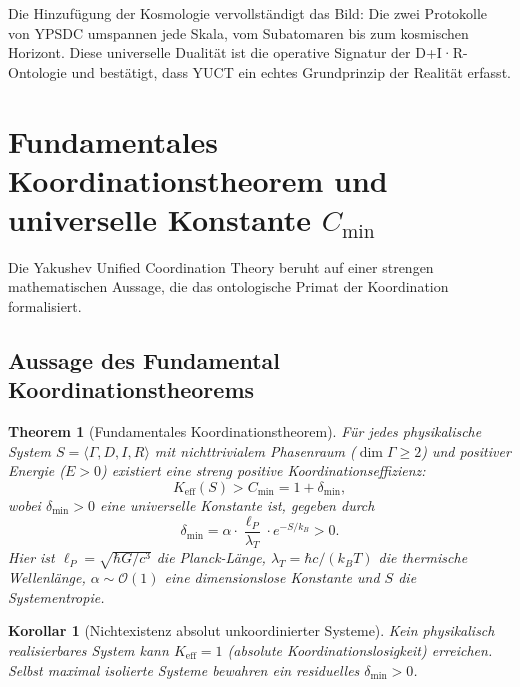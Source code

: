 \documentclass[11pt,a4paper]{article}
\newtheorem{theorem}{Theorem}
\newtheorem{corollary}{Korollar}
\begin{document}
	\noindent
	Die Hinzufügung der Kosmologie vervollständigt das Bild: Die zwei Protokolle von YPSDC umspannen jede Skala, vom Subatomaren bis zum kosmischen Horizont. Diese universelle Dualität ist die operative Signatur der D+I·R-Ontologie und bestätigt, dass YUCT ein echtes Grundprinzip der Realität erfasst.
	
	\section{Fundamentales Koordinationstheorem und universelle Konstante \texorpdfstring{$C_{\min}$}{C\_min}}
	\label{sec:fundamental-theorem}
	
	Die Yakushev Unified Coordination Theory beruht auf einer strengen mathematischen Aussage, die das ontologische Primat der Koordination formalisiert.
	
	\subsection{Aussage des Fundamental Koordinationstheorems}
	
	\begin{theorem}[Fundamentales Koordinationstheorem]
		Für jedes physikalische System \(S = \langle \Gamma, D, I, R \rangle\) mit nichttrivialem Phasenraum (\(\dim\Gamma \geq 2\)) und positiver Energie (\(E > 0\)) existiert eine streng positive Koordinationseffizienz:
		\begin{equation}
			\boxed{K_{\mathrm{eff}}(S) > C_{\min} = 1 + \delta_{\min}},
		\end{equation}
		wobei \(\delta_{\min} > 0\) eine universelle Konstante ist, gegeben durch
		\begin{equation}
			\delta_{\min} = \alpha \cdot \frac{\ell_P}{\lambda_T} \cdot e^{-S/k_B} > 0.
			\label{eq:delta-min}
		\end{equation}
		Hier ist \(\ell_P = \sqrt{\hbar G / c^3}\) die Planck-Länge, \(\lambda_T = \hbar c / (k_B T)\) die thermische Wellenlänge, \(\alpha \sim \mathcal{O}(1)\) eine dimensionslose Konstante und \(S\) die Systementropie.
	\end{theorem}
	
	\begin{corollary}[Nichtexistenz absolut unkoordinierter Systeme]
		Kein physikalisch realisierbares System kann \(K_{\mathrm{eff}} = 1\) (absolute Koordinationslosigkeit) erreichen. Selbst maximal isolierte Systeme bewahren ein residuelles \(\delta_{\min} > 0\).
	\end{corollary}
	
\end{document}
